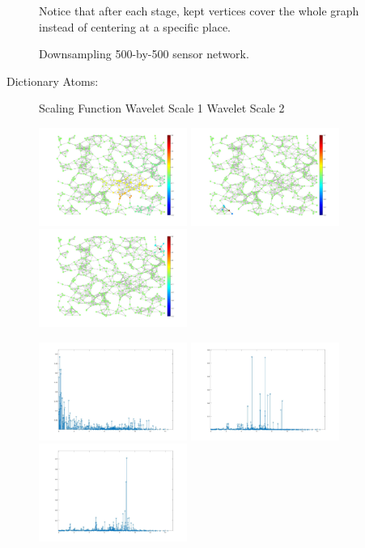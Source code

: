 \documentclass[a4paper]{article}
\begin{document}
\begin{figure}[h]
\caption{\label{fig:sensor network} Downsampling 500-by-500 sensor network.}
{Notice that after each stage, kept vertices cover the whole graph instead of centering at a specific place.}
\end{figure}

Dictionary Atoms:

\begin{figure}[H]
\centering
Scaling Function \qquad\qquad\qquad Wavelet Scale 1 \qquad\qquad\qquad Wavelet Scale 2

\includegraphics[width=4.84cm,keepaspectratio]{sensor_network/scaling} \includegraphics[width=4.85cm,keepaspectratio]{sensor_network/wavelet_scale_1_vertex} \includegraphics[width=4.85cm,keepaspectratio]{sensor_network/wavelet_scale_2_vertex}

\includegraphics[width=4.84cm,keepaspectratio]{sensor_network/scaling_frequency} \includegraphics[width=4.85cm,keepaspectratio]{sensor_network/wavelet_scale_1_frequency} \includegraphics[width=4.85cm,keepaspectratio]{sensor_network/wavelet_scale_2_frequency}


\end{figure}
\end{document}
